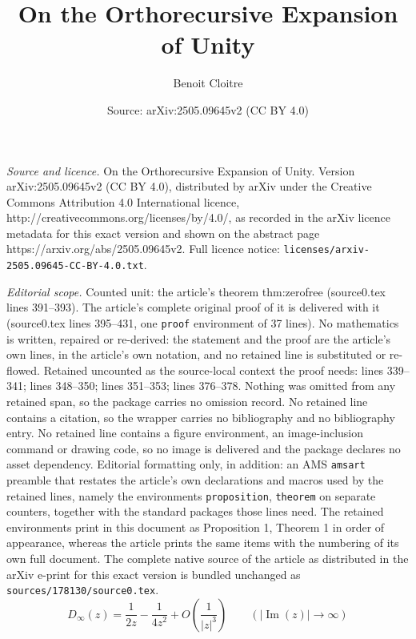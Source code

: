 \documentclass[10pt,a4paper]{amsart}
\title{On the Orthorecursive Expansion of Unity}
\author{Benoit Cloitre}
\date{Source: arXiv:2505.09645v2 (CC BY 4.0)}
\newcommand{\Imag}{\operatorname{Im}}
\begin{document}
\maketitle

\noindent\emph{Source and licence.} On the Orthorecursive Expansion of Unity. Version arXiv:2505.09645v2 (CC BY 4.0), distributed by arXiv under the Creative Commons Attribution 4.0 International licence, http://creativecommons.org/licenses/by/4.0/, as recorded in the arXiv licence metadata for this exact version and shown on the abstract page https://arxiv.org/abs/2505.09645v2. Full licence notice: \texttt{licenses/arxiv-2505.09645-CC-BY-4.0.txt}.\par\smallskip

\noindent\textit{Editorial scope.} Counted unit: the article's theorem thm:zerofree (source0.tex lines 391--393). The article's complete original proof of it is delivered with it (source0.tex lines 395--431, one \texttt{proof} environment of 37 lines). No mathematics is written, repaired or re-derived: the statement and the proof are the article's own lines, in the article's own notation, and no retained line is substituted or re-flowed.  Retained uncounted as the source-local context the proof needs: lines 339--341; lines 348--350; lines 351--353; lines 376--378.  Nothing was omitted from any retained span, so the package carries no omission record.  No retained line contains a citation, so the wrapper carries no bibliography and no bibliography entry.  No retained line contains a figure environment, an image-inclusion command or drawing code, so no image is delivered and the package declares no asset dependency.  Editorial formatting only, in addition: an AMS \texttt{amsart} preamble that restates the article's own declarations and macros used by the retained lines, namely the environments \texttt{proposition}, \texttt{theorem} on separate counters, together with the standard packages those lines need.  The retained environments print in this document as Proposition 1, Theorem 1 in order of appearance, whereas the article prints the same items with the numbering of its own full document.  The complete native source of the article as distributed in the arXiv e-print for this exact version is bundled unchanged as \texttt{sources/178130/source0.tex}.
\begin{equation}\label{eq:Dinfty_asymp}
D_\infty(z) = \frac{1}{2z} - \frac{1}{4z^2} + O\!\left(\frac{1}{|z|^3}\right) \qquad (|\Imag(z)| \to \infty)
\end{equation}
\end{document}
